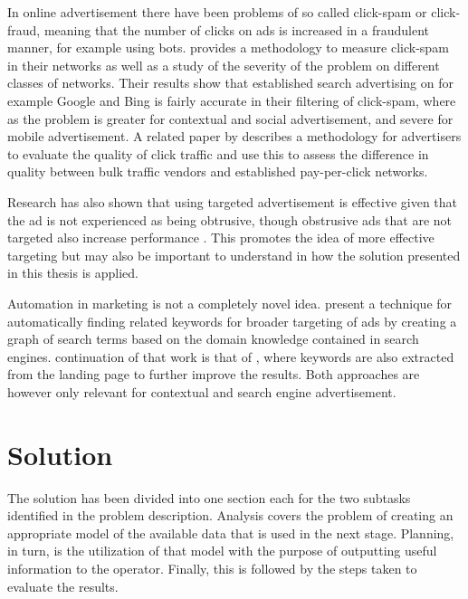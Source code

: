 \documentclass[11pt,a4paper]{report}
\begin{document}
In online advertisement there have been problems of so called click-spam or click-fraud, meaning that the number of clicks on ads is increased in a fraudulent manner, for example using bots. \citet{Dave2012} provides a methodology to measure click-spam in their networks as well as a study of the severity of the problem on different classes of networks. Their results show that established search advertising on for example Google and Bing is fairly accurate in their filtering of click-spam, where as the problem is  greater for contextual and social advertisement, and severe for mobile advertisement. A related paper by \citet{Zhang2011} describes a methodology for advertisers to evaluate the quality of click traffic and use this to assess the difference in quality between bulk traffic vendors and established pay-per-click networks.

Research has also shown that using targeted advertisement is effective given that the ad is not experienced as being obtrusive, though obstrusive ads that are not targeted also increase performance \citep{Goldfarb2011}. This promotes the idea of more effective targeting but may also be important to understand in how the solution presented in this thesis is applied.

Automation in marketing is not a completely novel idea. \citet{Joshi2006} present a technique for automatically finding related keywords for broader targeting of ads by creating a graph of search terms based on the domain knowledge contained in search engines. continuation of that work is that of \citet{Thomaidou2011}, where keywords are also extracted from the landing page to further improve the results. Both approaches are however only relevant for contextual and search engine advertisement.

\chapter{Solution}
The solution has been divided into one section each for the two subtasks identified in the problem description. Analysis covers the problem of creating an appropriate model of the available data that is used in the next stage. Planning, in turn, is the utilization of that model with the purpose of outputting useful information to the operator. Finally, this is followed by the steps taken to evaluate the results.
\end{document}
